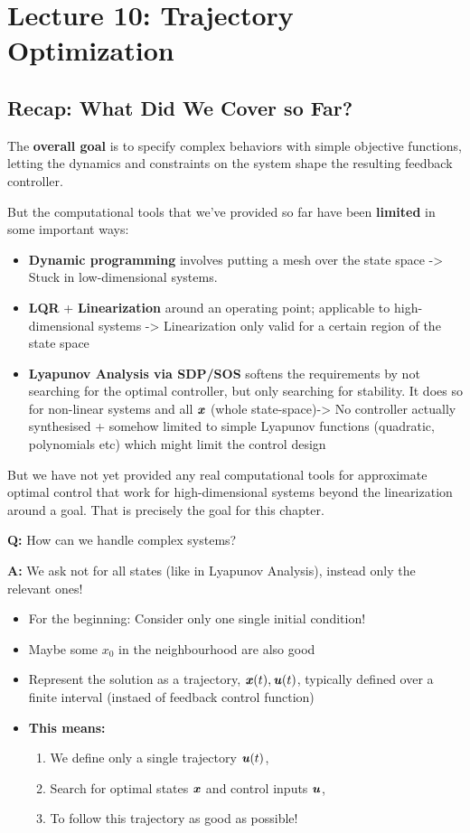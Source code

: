 \chapter{Lecture 10: Trajectory Optimization}
\section{Recap: What Did We Cover so Far?}
The\textbf{ overall goal} is to specify complex behaviors with simple objective functions, letting the dynamics and constraints on the system shape the resulting feedback controller.

But the computational tools that we've provided so far have been \textbf{limited} in some important ways:
\begin{itemize}
\item \textbf{Dynamic programming} involves putting a mesh over the state space -> Stuck in low-dimensional systems.
\item \textbf{LQR} + \textbf{Linearization} around an operating point; applicable to high-dimensional systems -> Linearization only valid for a certain region of the state space
\item \textbf{Lyapunov Analysis via SDP/SOS} softens the requirements by not searching for the optimal controller, but only searching for stability. It does so for non-linear systems and all $\bm{\mathit{x}}$ (whole state-space)-> No controller actually synthesised + somehow limited to simple Lyapunov functions (quadratic, polynomials etc) which might limit the control design  
\end{itemize}
But we have not yet provided any real computational tools for approximate optimal control that work for high-dimensional systems beyond the linearization around a goal. That is precisely the goal for this chapter.

\textbf{Q:} How can we handle complex systems?

\textbf{A:} We ask not for all states (like in Lyapunov Analysis), instead only the relevant ones!
\begin{itemize}
\item For the beginning: Consider only one single initial condition!
\item Maybe some $x_0$ in the neighbourhood are also good
\item Represent the solution as a trajectory,  $\bm{\mathit{x}}(t), \bm{\mathit{u}}(t)$, typically defined over a finite interval (instaed of feedback control function)
\item \textbf{This means:} 
\begin{enumerate}
\item We define only a single trajectory $\bm{\mathit{u}}(t)$, 
\item Search for optimal states $\bm{\mathit{x}}$ and control inputs $\bm{\mathit{u}}$,
\item To follow this trajectory as good as possible!
\end{enumerate}
\end{itemize}



